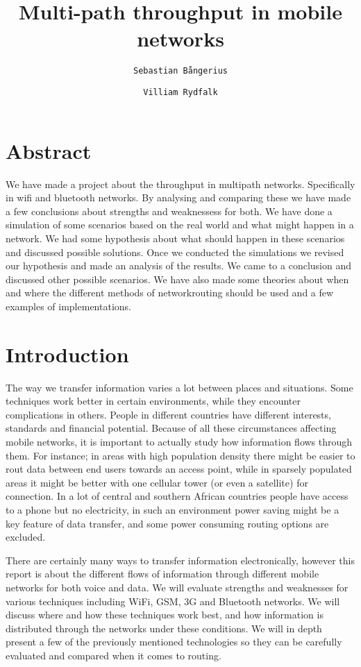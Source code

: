 \documentclass[11pt,twocolumn]{article}
\author{
  \texttt{Sebastian Bångerius}
  \and
  \texttt{Villiam Rydfalk}
}
\begin{document}

\title{Multi-path throughput in mobile networks}
\maketitle

\cleardoublepage


\section{Abstract}

We have made a project about the throughput in multipath networks. Specifically in wifi and bluetooth networks. By analysing and comparing these we have made a few conclusions about strengths and weaknessess for both. We have done a simulation of some scenarios based on the real world and what might happen in a network. We had some hypothesis about what should happen in these scenarios and discussed possible solutions. Once we conducted the simulations we revised our hypothesis and made an analysis of the results. We came to a conclusion and discussed other possible scenarios. We have also made some theories about when and where the different methods of networkrouting should be used and a few examples of implementations.

\section{Introduction}

The way we transfer information varies a lot between places and situations. Some techniques work better in certain environments, while they encounter complications in others. People in different countries have different interests, standards and financial potential. Because of all these circumstances affecting mobile networks, it is important to actually study how information flows through them. For instance; in areas with high population density there might be easier to rout data between end users towards an access point, while in sparsely populated areas it might be better with one cellular tower (or even a satellite) for connection. In a lot of central and southern African countries people have access to a phone but no electricity, in such an environment power saving might be a key feature of data transfer, and some power consuming routing options are excluded.

There are certainly many ways to transfer information electronically, however this report is about the different flows of information through different mobile networks for both voice and data. We will evaluate strengths and weaknesses for various techniques including WiFi, GSM, 3G and Bluetooth networks. We will discuss where and how these techniques work best, and how information is distributed through the networks under these conditions. We will in depth present a few of the previously mentioned technologies so they can be carefully evaluated and compared when it comes to routing.
\end{document}
